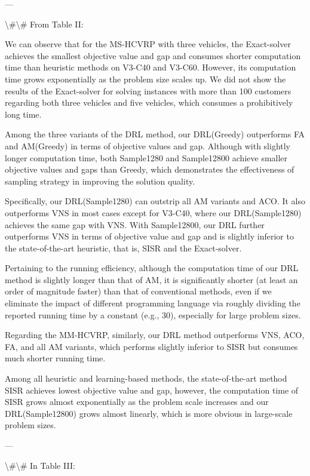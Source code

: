 \documentclass{article}
\begin{document}
	---
	
	\textbackslash{}#\textbackslash{}# From Table II:
	
	We can observe that for the MS-HCVRP with three vehicles, the Exact-solver achieves the smallest objective value and gap and consumes shorter computation time than heuristic methods on V3-C40 and V3-C60. However, its computation time grows exponentially as the problem size scales up. We did not show the results of the Exact-solver for solving instances with more than 100 customers regarding both three vehicles and five vehicles, which consumes a prohibitively long time.
	
	Among the three variants of the DRL method, our DRL(Greedy) outperforms FA and AM(Greedy) in terms of objective values and gap. Although with slightly longer computation time, both Sample1280 and Sample12800 achieve smaller objective values and gaps than Greedy, which demonstrates the effectiveness of sampling strategy in improving the solution quality.
	
	Specifically, our DRL(Sample1280) can outstrip all AM variants and ACO. It also outperforms VNS in most cases except for V3-C40, where our DRL(Sample1280) achieves the same gap with VNS. With Sample12800, our DRL further outperforms VNS in terms of objective value and gap and is slightly inferior to the state-of-the-art heuristic, that is, SISR and the Exact-solver.
	
	Pertaining to the running efficiency, although the computation time of our DRL method is slightly longer than that of AM, it is significantly shorter (at least an order of magnitude faster) than that of conventional methods, even if we eliminate the impact of different programming language via roughly dividing the reported running time by a constant (e.g., 30), especially for large problem sizes.
	
	Regarding the MM-HCVRP, similarly, our DRL method outperforms VNS, ACO, FA, and all AM variants, which performs slightly inferior to SISR but consumes much shorter running time.
	
	Among all heuristic and learning-based methods, the state-of-the-art method SISR achieves lowest objective value and gap, however, the computation time of SISR grows almost exponentially as the problem scale increases and our DRL(Sample12800) grows almost linearly, which is more obvious in large-scale problem sizes.
	
	---
	
	\textbackslash{}#\textbackslash{}# In Table III:
	
\end{document}
